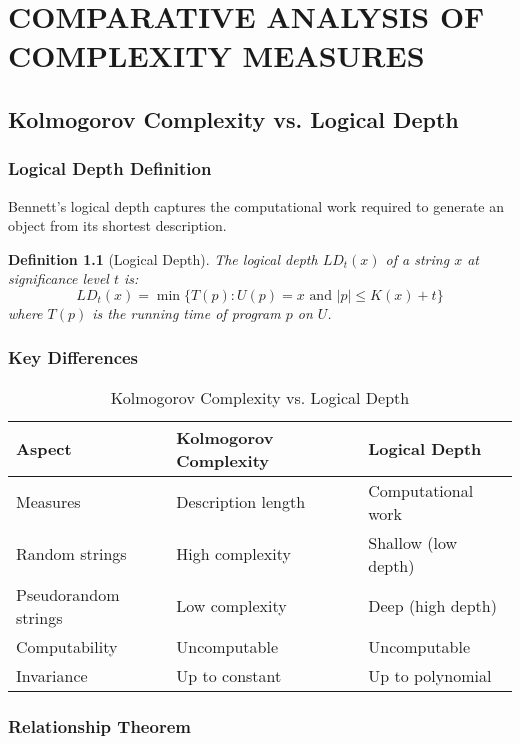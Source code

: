 \documentclass[12pt,a4paper]{report}
\newtheorem{definition}[theorem]{Definition}
\begin{document}
\chapter{COMPARATIVE ANALYSIS OF COMPLEXITY MEASURES}

\section{Kolmogorov Complexity vs. Logical Depth}

\subsection{Logical Depth Definition}

Bennett's logical depth \cite{bennett1988logical} captures the computational work required to generate an object from its shortest description.

\begin{definition}[Logical Depth]
The logical depth $LD_t(x)$ of a string $x$ at significance level $t$ is:
\begin{equation}
LD_t(x) = \min\{T(p) : U(p) = x \text{ and } |p| \leq K(x) + t\}
\end{equation}
where $T(p)$ is the running time of program $p$ on $U$.
\end{definition}

\subsection{Key Differences}

\begin{table}[h]
\centering
\caption{Kolmogorov Complexity vs. Logical Depth}
\begin{tabular}{lll}
\toprule
\textbf{Aspect} & \textbf{Kolmogorov Complexity} & \textbf{Logical Depth} \\
\midrule
Measures & Description length & Computational work \\
Random strings & High complexity & Shallow (low depth) \\
Pseudorandom strings & Low complexity & Deep (high depth) \\
Computability & Uncomputable & Uncomputable \\
Invariance & Up to constant & Up to polynomial \\
\bottomrule
\end{tabular}
\end{table}

\subsection{Relationship Theorem}
\end{document}
